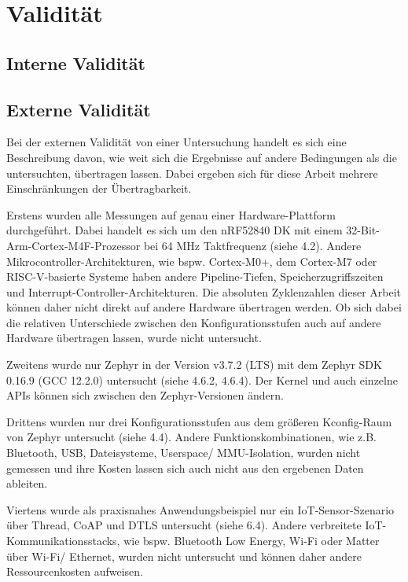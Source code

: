 \chapter{Validit{\"a}t}
\label{ch:validitaet}


\section{Interne Validit{\"a}t}

\section{Externe Validit{\"a}t}
Bei der externen Validit{\"a}t von einer Untersuchung handelt es sich eine Beschreibung davon, wie weit sich die Ergebnisse auf andere Bedingungen als die untersuchten, {\"u}bertragen lassen. Dabei ergeben sich f{\"u}r diese Arbeit mehrere Einschr{\"a}nkungen der {\"U}bertragbarkeit.

Erstens wurden alle Messungen auf genau einer Hardware-Plattform durchgef{\"u}hrt. Dabei handelt es sich um den nRF52840 DK mit einem 32-Bit-Arm-Cortex-M4F-Prozessor bei 64 MHz Taktfrequenz (siehe 4.2). Andere Mikrocontroller-Architekturen, wie bspw. Cortex-M0+, dem Cortex-M7 oder RISC-V-basierte Systeme haben andere Pipeline-Tiefen, Speicherzugriffszeiten und Interrupt-Controller-Architekturen. Die absoluten Zyklenzahlen dieser Arbeit k{\"o}nnen daher nicht direkt auf andere Hardware {\"u}bertragen werden. Ob sich dabei die relativen Unterschiede zwischen den Konfigurationsstufen auch auf andere Hardware {\"u}bertragen lassen, wurde nicht untersucht.

Zweitens wurde nur Zephyr in der Version v3.7.2 (LTS) mit dem Zephyr SDK 0.16.9 (GCC 12.2.0) untersucht (siehe 4.6.2, 4.6.4). Der Kernel und auch einzelne APIs k{\"o}nnen sich zwischen den Zephyr-Versionen {\"a}ndern.

Drittens wurden nur drei Konfigurationsstufen aus dem gr{\"o}{\ss}eren Kconfig-Raum von Zephyr untersucht (siehe 4.4). Andere Funktionskombinationen, wie z.B. Bluetooth, USB, Dateisysteme, Userspace/ MMU-Isolation, wurden nicht gemessen und ihre Kosten lassen sich auch nicht aus den ergebenen Daten ableiten.

Viertens wurde als praxisnahes Anwendungsbeispiel nur ein IoT-Sensor-Szenario {\"u}ber Thread, CoAP und DTLS untersucht (siehe 6.4). Andere verbreitete IoT-Kommunikationsstacks, wie bspw. Bluetooth Low Energy, Wi-Fi oder Matter {\"u}ber Wi-Fi/ Ethernet, wurden nicht untersucht und k{\"o}nnen daher andere Ressourcenkosten aufweisen.


